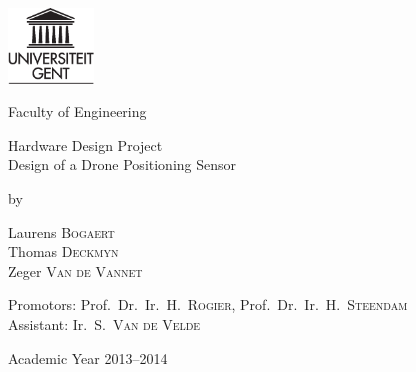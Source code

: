 

\begin{titlepage}
%

\fontsize{12pt}{14pt}
\selectfont

\begin{center}

\includegraphics[height=2cm]{ruglogo}

\vspace{0.5cm}

Faculty of Engineering

\vspace{3.5cm}

\fontsize{17.28pt}{21pt}
\selectfont

Hardware Design Project\\
Design of a Drone Positioning Sensor

\fontsize{12pt}{14pt}
\selectfont

\vspace{.6cm}

by 

\vspace{.4cm}

Laurens \textsc{Bogaert}\\
Thomas \textsc{Deckmyn}\\
Zeger \textsc{Van de Vannet}

\vspace{3.5cm}

Promotors: Prof.~Dr.~Ir.~H.~\textsc{Rogier},
			Prof.~Dr.~Ir.~H.~\textsc{Steendam}\\
Assistant: Ir.~S.~\textsc{Van de Velde}\\

\vspace{2cm}


\vspace{1cm}

Academic Year 2013--2014

\end{center}
\end{titlepage}
